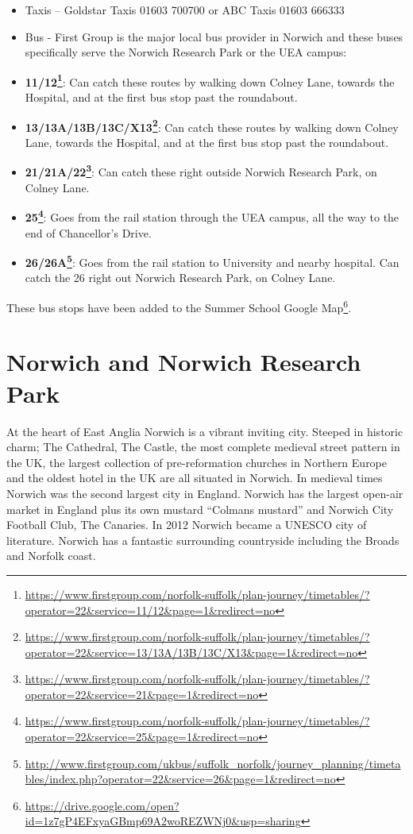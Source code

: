 \documentclass[12pt,]{book}
\providecommand{\tightlist}{%
  \setlength{\itemsep}{0pt}\setlength{\parskip}{0pt}}
\let\rmarkdownfootnote\footnote%
\def\footnote{\protect\rmarkdownfootnote}
\renewcommand{\href}[2]{#2\footnote{\url{#1}}}
\theoremstyle{definition}
\theoremstyle{definition}
\theoremstyle{remark}
\begin{document}
\begin{itemize}
\tightlist
\item
  Taxis -- Goldstar Taxis 01603 700700 or ABC Taxis 01603 666333
\item
  Bus - First Group is the major local bus provider in Norwich and these
  buses specifically serve the Norwich Research Park or the UEA campus:
\item
  \textbf{\href{https://www.firstgroup.com/norfolk-suffolk/plan-journey/timetables/?operator=22\&service=11/12\&page=1\&redirect=no}{11/12}}:
  Can catch these routes by walking down Colney Lane, towards the
  Hospital, and at the first bus stop past the roundabout.
\item
  \textbf{\href{https://www.firstgroup.com/norfolk-suffolk/plan-journey/timetables/?operator=22\&service=13/13A/13B/13C/X13\&page=1\&redirect=no}{13/13A/13B/13C/X13}}:
  Can catch these routes by walking down Colney Lane, towards the
  Hospital, and at the first bus stop past the roundabout.
\item
  \textbf{\href{https://www.firstgroup.com/norfolk-suffolk/plan-journey/timetables/?operator=22\&service=21\&page=1\&redirect=no}{21/21A/22}}:
  Can catch these right outside Norwich Research Park, on Colney Lane.
\item
  \textbf{\href{https://www.firstgroup.com/norfolk-suffolk/plan-journey/timetables/?operator=22\&service=25\&page=1\&redirect=no}{25}}:
  Goes from the rail station through the UEA campus, all the way to the
  end of Chancellor's Drive.
\item
  \textbf{\href{http://www.firstgroup.com/ukbus/suffolk_norfolk/journey_planning/timetables/index.php?operator=22\&service=26\&page=1\&redirect=no}{26/26A}}:
  Goes from the rail station to University and nearby hospital. Can
  catch the 26 right out Norwich Research Park, on Colney Lane.
\end{itemize}

These bus stops have been added to the
\href{https://drive.google.com/open?id=1z7gP4EFxyaGBmp69A2woREZWNj0\&usp=sharing}{Summer
School Google Map}.

\section*{Norwich and Norwich Research
Park}\label{norwich-and-norwich-research-park}

At the heart of East Anglia Norwich is a vibrant inviting city. Steeped
in historic charm; The Cathedral, The Castle, the most complete medieval
street pattern in the UK, the largest collection of pre-reformation
churches in Northern Europe and the oldest hotel in the UK are all
situated in Norwich. In medieval times Norwich was the second largest
city in England. Norwich has the largest open-air market in England plus
its own mustard ``Colmans mustard'' and Norwich City Football Club, The
Canaries. In 2012 Norwich became a UNESCO city of literature. Norwich
has a fantastic surrounding countryside including the Broads and Norfolk
coast.
\end{document}
